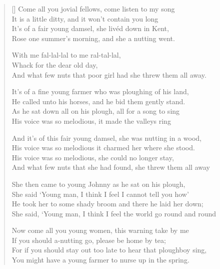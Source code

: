 \pagebreak
\settowidth{\versewidth}{It's of a fine young farmer who was ploughing of his land}
\begin{verse}[\versewidth]
Come all you jovial fellows, come listen to my song\\
It is a little ditty, and it won't contain you long\\
It's of a fair young damsel, she liv\'{e}d down in Kent,\\
Rose one summer's morning, and she a nutting went.

\begin{chorus}
With me fal-lal-lal to me ral-tal-lal,\\
Whack for the dear old day,\\
And what few nuts that poor girl had she threw them all away.
\end{chorus}

It's of a fine young farmer who was ploughing of his land,\\
He called unto his horses, and he bid them gently stand.\\
As he sat down all on his plough, all for a song to sing\\
His voice was so melodious, it made the valleys ring

And it's of this fair young damsel, she was nutting in a wood,\\
His voice was so melodious it charmed her where she stood.\\
His voice was so melodious, she could no longer stay,\\
And what few nuts that she had found, she threw them all away

She then came to young Johnny as he sat on his plough,\\
She said `Young man, I think I feel I cannot tell you how'\\
He took her to some shady broom and there he laid her down;\\
She said, `Young man, I think I feel the world go round and round

Now come all you young women, this warning take by me\\
If you should a-nutting go, please be home by tea;\\
For if you should stay out too late to hear that ploughboy sing,\\
You might have a young farmer to nurse up in the spring.
\end{verse}
